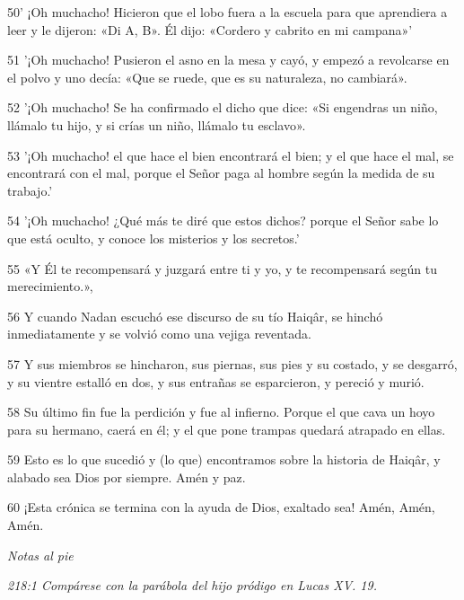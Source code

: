 \par 50' ¡Oh muchacho! Hicieron que el lobo fuera a la escuela para que aprendiera a leer y le dijeron: «Di A, B». Él dijo: «Cordero y cabrito en mi campana»'

\par 51 '¡Oh muchacho! Pusieron el asno en la mesa y cayó, y empezó a revolcarse en el polvo y uno decía: «Que se ruede, que es su naturaleza, no cambiará».

\par 52 '¡Oh muchacho! Se ha confirmado el dicho que dice: «Si engendras un niño, llámalo tu hijo, y si crías un niño, llámalo tu esclavo».

\par 53 '¡Oh muchacho! el que hace el bien encontrará el bien; y el que hace el mal, se encontrará con el mal, porque el Señor paga al hombre según la medida de su trabajo.'

\par 54 '¡Oh muchacho! ¿Qué más te diré que estos dichos? porque el Señor sabe lo que está oculto, y conoce los misterios y los secretos.'

\par 55 «Y Él te recompensará y juzgará entre ti y yo, y te recompensará según tu merecimiento.»,

\par 56 Y cuando Nadan escuchó ese discurso de su tío Haiqâr, se hinchó inmediatamente y se volvió como una vejiga reventada.

\par 57 Y sus miembros se hincharon, sus piernas, sus pies y su costado, y se desgarró, y su vientre estalló en dos, y sus entrañas se esparcieron, y pereció y murió.

\par 58 Su último fin fue la perdición y fue al infierno. Porque el que cava un hoyo para su hermano, caerá en él; y el que pone trampas quedará atrapado en ellas.

\par 59 Esto es lo que sucedió y (lo que) encontramos sobre la historia de Haiqâr, y alabado sea Dios por siempre. Amén y paz.

\par 60 ¡Esta crónica se termina con la ayuda de Dios, exaltado sea! Amén, Amén, Amén.

\par \textit{Notas al pie}

\par \textit{218:1 Compárese con la parábola del hijo pródigo en Lucas XV. 19.}


